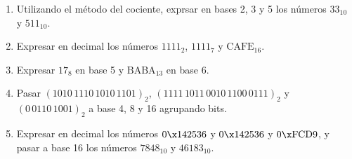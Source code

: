 \begin{enunciado}{\ejercicio}
	\begin{enumerate}[label=\roman*)]
		\item Utilizando el método del cociente, exprsar en bases 2, 3 y 5 los números $33_{10}$ y $511_{10}$.

		\item Expresar en decimal los números $1111_2$, $1111_7$ y $\text{CAFE}_{16}$.

		\item Expresar $17_8$ en base 5 y $\text{BABA}_{13}$ en base 6.

		\item  Pasar $(1010\, 1110\, 1010\, 1101)_2$, $(1111 \, 1011 \, 0010 \, 1100 \, 0111)_2$ y
		      $(0 \, 0110 \, 1001)_2$ a base 4, 8 y 16 agrupando bits.

		\item Expresar en decimal los números $0\x142536$ y $0\x142536$ y $0\x\text{FCD}9$, y pasar a base
		      16 los números $7848_{10}$ y $46183_{10}$.
	\end{enumerate}
\end{enunciado}

